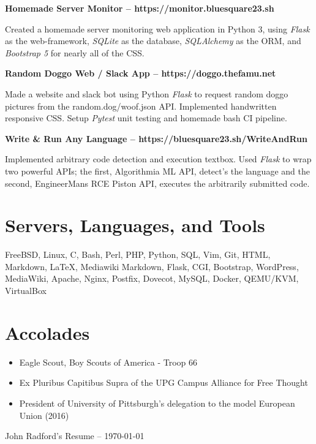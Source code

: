 \documentclass{article}
\begin{document}
\noindent
\textbf{Homemade Server Monitor -- https://monitor.bluesquare23.sh}

Created a homemade server monitoring web application in Python 3, using
\emph{Flask} as the web-framework, \emph{SQLite} as the database,
\emph{SQLAlchemy} as the ORM, and \emph{Bootstrap 5} for nearly all of the CSS.

\noindent
\textbf{Random Doggo Web / Slack App -- https://doggo.thefamu.net}

Made a website and slack bot using Python \emph{Flask} to request random doggo
pictures from the random.dog/woof.json API. Implemented handwritten responsive
CSS. Setup \emph{Pytest} unit testing and homemade bash CI pipeline.

\noindent
\textbf{Write \& Run Any Language -- https://bluesquare23.sh/WriteAndRun}

Implemented arbitrary code detection and execution textbox. Used \emph{Flask}
to wrap two powerful APIs; the first, Algorithmia ML API, detect's the language
and the second, EngineerMans RCE Piston API, executes the arbitrarily submitted
code.

\section{Servers, Languages, and Tools}

FreeBSD, Linux, C, Bash, Perl, PHP, Python, SQL, Vim, Git, HTML, Markdown,
{\LaTeX}, Mediawiki Markdown, Flask, CGI, Bootstrap, WordPress, MediaWiki,
Apache, Nginx, Postfix, Dovecot, MySQL, Docker, QEMU/KVM, VirtualBox 

\section{Accolades}

\begin{itemize}
\item Eagle Scout, Boy Scouts of America - Troop 66

\item Ex Pluribus Capitibus Supra of the UPG Campus Alliance for Free Thought

\item President of University of Pittsburgh's delegation to the model European Union (2016)
\end{itemize}

\vfill

\begin{center}
John Radford's Resume -- \small\today\\
\end{center}
\end{document}
